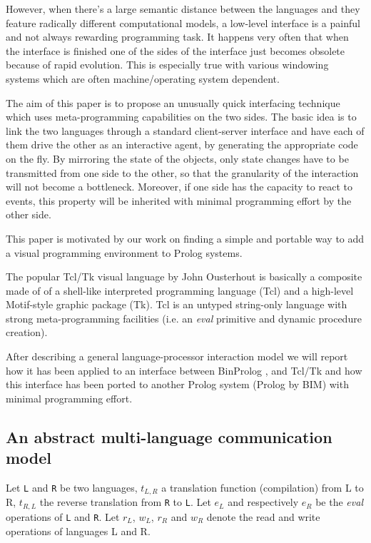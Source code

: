\documentclass{article}
\begin{document}
However, when there's a large
semantic distance between the languages and they feature
radically different computational models, a low-level
interface is a painful and not always rewarding programming
task. It happens very often that when the interface is finished
one of the sides of the interface just becomes obsolete
because of
rapid evolution. This is especially true with various
windowing systems which are often machine/operating system dependent.
 
The aim of this paper is to propose an unusually quick
interfacing technique which uses meta-programming capabilities
on the two sides. The basic idea is to link the two languages
through a standard client-server interface and have each of
them drive the other as an interactive agent, by generating
the appropriate code on the fly.
By mirroring the state of the objects, only state
changes have to be transmitted from one side to the other,
so that the granularity of the interaction will not become
a bottleneck. Moreover, if one side has the capacity to
react to events, this property will be inherited with
minimal programming effort by the other side.

This paper is motivated by our work on finding a simple and
portable way to add a visual programming environment to
Prolog systems.

The popular Tcl/Tk visual language by John Ousterhout \cite{Oust:TclTk}
is basically a composite made of
of a shell-like interpreted programming
language (Tcl) and a high-level Motif-style graphic
package (Tk). Tcl is an untyped string-only language with
strong meta-programming facilities (i.e. an {\em eval} primitive
and dynamic procedure creation).

After describing a general language-processor interaction
model we will report
how it has been applied to an interface between BinProlog \cite{Tarau93:GULP},
and Tcl/Tk and how this interface has been ported to
another Prolog system (Prolog by BIM) with minimal
programming effort.

\subsection{An abstract multi-language communication model}

Let {\tt L} and {\tt R} be two languages, $t_{L,R}$ a translation function
(compilation) from L to R, $t_{R,L}$ the reverse translation from
{\tt R} to {\tt L}.
Let $e_L$ and respectively
$e_R$ be the {\em eval} operations of {\tt L} and {\tt R}.
Let $r_L$, $w_L$, $r_R$ and $w_R$ denote the read and write operations
of languages L and R.
\end{document}
